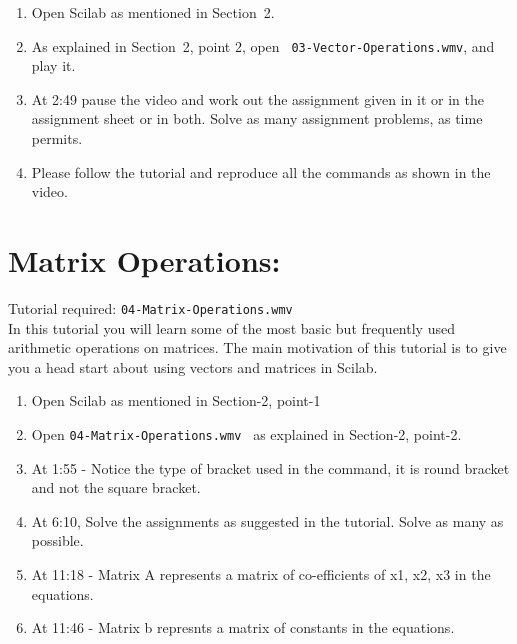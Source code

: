 \documentclass[11pt]{article}
\newenvironment{enumcpt}{\begin{enumerate} \topsep 0pt \partopsep 0pt 
                        \parsep 0pt
                        \itemsep 0pt \leftmargin -1in \rightmargin 0pt
                        }{\end{enumerate}}
\begin{document}
\begin{multicols}{2}
\begin{enumcpt}
\item Open Scilab as mentioned in Section~2.
\item As explained in Section~2, point 2, open {\tt
    03-Vector-Operations.wmv}, and play it.
\item At 2:49 pause the video and work out the assignment given in
  it or in the assignment sheet or in both.
  Solve as many assignment problems, as time permits.
\item Please follow the tutorial and reproduce all the commands as
  shown in the video. 
\end{enumcpt}

\section{Matrix Operations:}
Tutorial required: {\tt 04-Matrix-Operations.wmv } \\ In this tutorial
you will learn some of the most basic but frequently used arithmetic
operations on matrices. The main motivation of this tutorial is to
give you a head start about using vectors and matrices in Scilab. 

\begin{enumcpt}
\item Open Scilab as mentioned in Section-2, point-1
\item Open {\tt 04-Matrix-Operations.wmv } as explained in Section-2,
  point-2.
\item At 1:55 - Notice the type of bracket used in the command, it is
  round bracket and not the square bracket. 
\item At 6:10, Solve the assignments as suggested in the tutorial.  Solve as
  many as possible.
\item At 11:18 - Matrix A represents a matrix of co-efficients of x1, x2, x3 in the equations.
\item At 11:46 - Matrix b represnts a matrix of constants in the equations.


\end{enumcpt}


\end{multicols}
\end{document}

